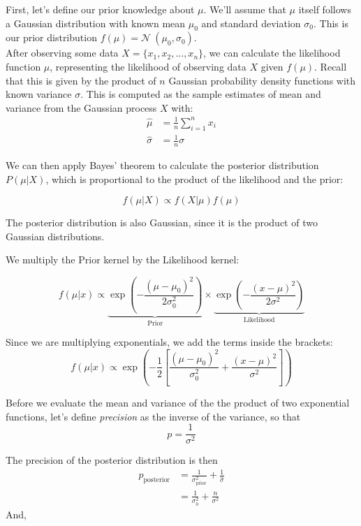 \documentclass[12pt]{book}
\theoremstyle{definition}
\begin{document}
First, let's define our prior knowledge about $\mu$. We'll assume that $\mu$ itself follows a Gaussian distribution with known mean $\mu_0$ and standard deviation $\sigma_0$. This is our prior distribution \(f(\mu) = \mathcal{N}\ (\mu_0, \sigma_0)\).\\

After observing some data $X = \{x_1, x_2, ..., x_n\}$, we can calculate the likelihood function $\mu$, representing the likelihood of observing data $X$ given $f(\mu)$. Recall that this is given by the product of $n$ Gaussian probability density functions with known variance $\sigma$. This is computed as the sample estimates of mean and variance from the Gaussian process \(X\) with:
\[
\begin{aligned}
 \hat{\mu} & = \frac{1}{n}\sum_{i=1}^n x_i\\
 \hat{\sigma} & =  \frac{1}{n}\sigma
 \end{aligned}
\]

We can then apply Bayes' theorem to calculate the posterior distribution $P(\mu|X)$, which is proportional to the product of the likelihood and the prior:

$$ f(\mu|X) \propto f(X|\mu)f(\mu) $$

The posterior distribution is also Gaussian, since it is the product of two Gaussian distributions. 

We multiply the Prior kernel by the Likelihood kernel:

$$f(\mu | x) \propto \underbrace{\exp\left( -\frac{(\mu - \mu_0)^2}{2\sigma_0^2} \right)}_{\text{Prior}} \times \underbrace{\exp\left( -\frac{(x - \mu)^2}{2\sigma^2} \right)}_{\text{Likelihood}}$$

Since we are multiplying exponentials, we add the terms inside the brackets:$$f(\mu | x) \propto \exp\left( -\frac{1}{2} \left[ \frac{(\mu - \mu_0)^2}{\sigma_0^2} + \frac{(x - \mu)^2}{\sigma^2} \right] \right)$$


Before we evaluate the mean and variance of the  the product of two exponential functions, let's define \emph{precision} as the inverse of the variance, so that
\[
p = \frac{1}{\sigma^2}
\]

The precision of the posterior distribution is then
\[
\begin{aligned}
    p_{\text{posterior}} & = \frac{1} {\sigma^2_{\text{prior}}} + \frac{1}{\hat{\sigma}} \\
        & = \frac{1} {\sigma^2_0} + \frac{n}{\sigma^2}
\end{aligned}
\]
And,
\end{document}
